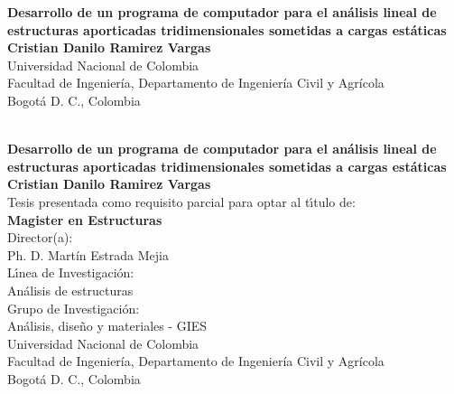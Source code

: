\begin{center}
\begin{figure}
\centering%
%
\end{figure}
\thispagestyle{empty} \vspace*{2.0cm} \textbf{\huge
Desarrollo de un programa de computador para el análisis lineal de estructuras aporticadas tridimensionales sometidas a cargas estáticas}\\[4.5cm]
\Large\textbf{Cristian Danilo Ramirez Vargas}\\[4.5cm]
\small Universidad Nacional de Colombia\\
Facultad de Ingeniería, Departamento de Ingeniería Civil y Agrícola\\
Bogotá D. C., Colombia\\
\the\year\\
\end{center}

\newpage{\pagestyle{empty}\cleardoublepage}

\newpage
\begin{center}
\thispagestyle{empty} \vspace*{0cm} \textbf{\huge
Desarrollo de un programa de computador para el análisis lineal de estructuras aporticadas tridimensionales sometidas a cargas estáticas}\\[1.0cm]
\Large\textbf{Cristian Danilo Ramirez Vargas}\\[3.0cm]
\small Tesis presentada como requisito parcial para optar al
t\'{\i}tulo de:\\
\textbf{Magister en Estructuras}\\[2.5cm]
Director(a):\\
Ph. D. Martín Estrada Mejia\\[2.0cm]
L\'{\i}nea de Investigaci\'{o}n:\\
Análisis de estructuras\\
Grupo de Investigaci\'{o}n:\\
Análisis, diseño y materiales - GIES\\[2.0cm]
Universidad Nacional de Colombia\\
Facultad de Ingeniería, Departamento de Ingeniería Civil y Agrícola\\
Bogotá D. C., Colombia\\
\the\year\\
\end{center}

\newpage{\pagestyle{empty}\cleardoublepage}

